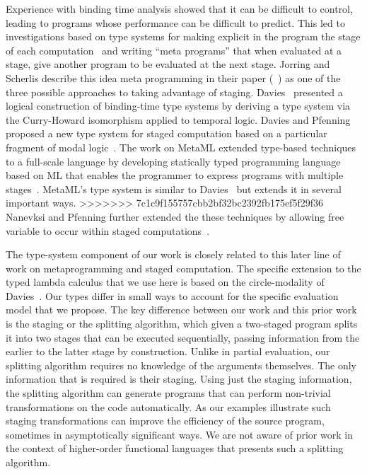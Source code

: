 Experience with binding time analysis showed that it can be difficult
to control, leading to programs whose performance can be difficult to
predict. This led to investigations based on type systems for making
explicit in the program the stage of each
computation~\cite{GJ91-lambda,NN92-twolevel} and writing ``meta
programs'' that when evaluated at a stage, give another program to be
evaluated at the next stage. Jorring and Scherlis describe this idea
meta programming in their paper (~\cite{JS86-staging}) as one of the
three possible approaches to taking advantage of
staging. Davies~\cite{davies96} presented a logical construction of
binding-time type systems by deriving a type system via the
Curry-Howard isomorphism applied to temporal logic.  Davies and
Pfenning proposed a new type system for staged computation based on a
particular fragment of modal logic~\cite{DP01-modal}. The work on
MetaML extended type-based techniques to a full-scale language by
developing statically typed programming language based on ML that
enables the programmer to express programs with multiple
stages~\cite{Taha97,taha-thesis-99}.  MetaML's type system is similar
to Davies~\cite{davies96} but extends it in several important ways.
>>>>>>> 7c1c9f155757cbb2bf32bc2392fb175ef5f29f36
Nanevksi and Pfenning further extended the these techniques by
allowing free variable to occur within staged
computations~\cite{NP05-nn}.

The type-system component of our work is closely related to this later
line of work on metaprogramming and staged computation.  The specific
extension to the typed lambda calculus that we use here is based on
the circle-modality of Davies~\cite{DP01-modal}.  Our types differ in
small ways to account for the specific evaluation model that we
propose.  The key difference between our work and this prior work is
the staging or the splitting algorithm, which given a two-staged
program splits it into two stages that can be executed sequentially,
passing information from the earlier to the latter stage by
construction. 
%
%
Unlike in partial evaluation, our splitting algorithm requires no
knowledge of the arguments themselves. The only information that is
required is their staging. Using just the staging information, the
splitting algorithm can generate programs that can perform non-trivial
transformations on the code automatically.  As our examples illustrate
such staging transformations can improve the efficiency of the source
program, sometimes in asymptotically significant ways.  
We are not aware of prior work in the context of higher-order
functional languages that presents such a splitting algorithm.

